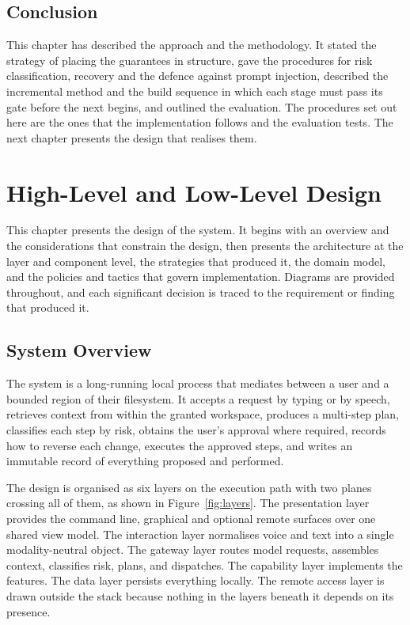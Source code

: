 \documentclass{FastFyp}
\begin{document}
\section{Conclusion}
This chapter has described the approach and the methodology. It stated the strategy of placing the guarantees in structure, gave the procedures for risk classification, recovery and the defence against prompt injection, described the incremental method and the build sequence in which each stage must pass its gate before the next begins, and outlined the evaluation. The procedures set out here are the ones that the implementation follows and the evaluation tests. The next chapter presents the design that realises them.

\chapter{High-Level and Low-Level Design}
This chapter presents the design of the system. It begins with an overview and the considerations that constrain the design, then presents the architecture at the layer and component level, the strategies that produced it, the domain model, and the policies and tactics that govern implementation. Diagrams are provided throughout, and each significant decision is traced to the requirement or finding that produced it.

\section{System Overview}
The system is a long-running local process that mediates between a user and a bounded region of their filesystem. It accepts a request by typing or by speech, retrieves context from within the granted workspace, produces a multi-step plan, classifies each step by risk, obtains the user's approval where required, records how to reverse each change, executes the approved steps, and writes an immutable record of everything proposed and performed.

The design is organised as six layers on the execution path with two planes crossing all of them, as shown in Figure~\ref{fig:layers}. The presentation layer provides the command line, graphical and optional remote surfaces over one shared view model. The interaction layer normalises voice and text into a single modality-neutral object. The gateway layer routes model requests, assembles context, classifies risk, plans, and dispatches. The capability layer implements the features. The data layer persists everything locally. The remote access layer is drawn outside the stack because nothing in the layers beneath it depends on its presence.
\end{document}
